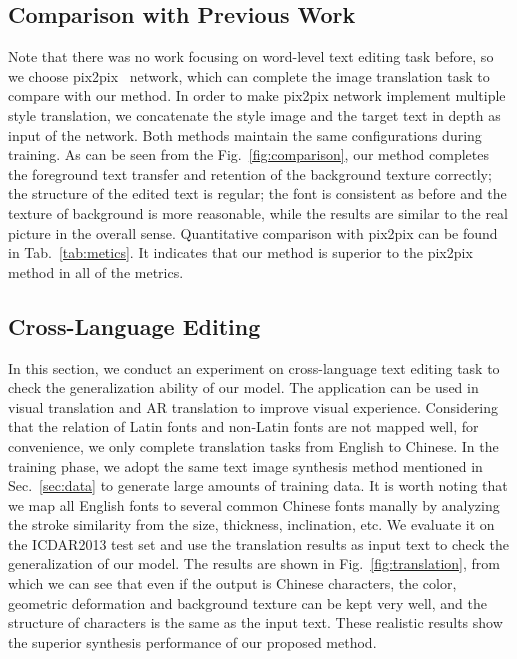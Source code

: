 \documentclass[sigconf]{acmart}
\begin{document}
\subsection{Comparison with Previous Work}
Note that there was no work focusing on word-level text editing task before, so we choose pix2pix~\cite{isola2017image} network, which can complete the image translation task to compare with our method. In order to make pix2pix network implement multiple style translation, we concatenate the style image and the target text in depth as input of the network. Both methods maintain the same configurations during training. As can be seen from the Fig.~\ref{fig:comparison}, our method completes the foreground text transfer and retention of the background texture correctly; the structure of the edited text is regular; the font is consistent as before and the texture of background is more reasonable, while the results are similar to the real picture in the overall sense.
Quantitative comparison with pix2pix can be found in Tab.~\ref{tab:metics}. It indicates that our method is superior to the pix2pix method in all of the metrics.


\subsection{Cross-Language Editing}
In this section, we conduct an experiment on cross-language text editing task to check the generalization ability of our model. The application can be used in visual translation and AR translation to improve visual experience. Considering that the relation of Latin fonts and non-Latin fonts are not mapped well, for convenience, we only complete translation tasks from English to Chinese. 
In the training phase, we adopt the same text image synthesis method mentioned in Sec.~\ref{sec:data} to generate large amounts of training data.
It is worth noting that we map all English fonts to several common Chinese fonts manally by analyzing the stroke similarity from the size, thickness, inclination, etc.
We evaluate it on the ICDAR2013 test set and use the translation results as input text to check the generalization of our model. The results are shown in Fig.~\ref{fig:translation}, from which we can see that even if the output is Chinese characters, the color, geometric deformation and background texture can be kept very well, and the structure of characters is the same as the input text. These realistic results show the superior synthesis performance of our proposed method.
\end{document}
